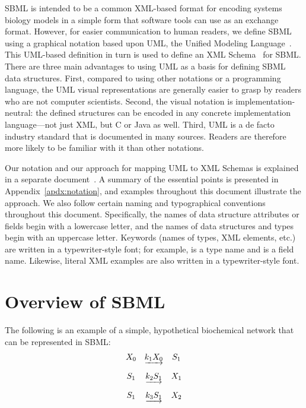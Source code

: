\documentclass[10pt]{cekarticle}
\begin{document}
SBML is intended to be a common XML-based format for encoding systems
biology models in a simple form that software tools can use as an exchange
format.  However, for easier communication to human readers, we define SBML
using a graphical notation based upon UML, the Unified Modeling
Language~\citep{eriksson:1998,oestereich:1999}.  This UML-based definition
in turn is used to define an XML
Schema~\citep{biron:2000,fallside:2000,thompson:2000} for SBML.  There are
three main advantages to using UML as a basis for defining SBML data
structures.  First, compared to using other notations or a programming
language, the UML visual representations are generally easier to grasp by
readers who are not computer scientists.  Second, the visual notation is
implementation-neutral: the defined structures can be encoded in any
concrete implementation language---not just XML, but C or Java as well.
Third, UML is a de facto industry standard that is documented in many
sources.  Readers are therefore more likely to be familiar with it than
other notations.

Our notation and our approach for mapping UML to XML Schemas is explained
in a separate document~\citep{hucka:2000b}.  A summary of the essential
points is presented in Appendix~\ref{apdx:notation}, and examples
throughout this document illustrate the approach.  We also follow certain
naming and typographical conventions throughout this document.
Specifically, the names of data structure attributes or fields begin with a
lowercase letter, and the names of data structures and types begin with an
uppercase letter.  Keywords (names of types, XML elements, etc.) are
written in a typewriter-style font; for example,  is a
type name and  is a field name.  Likewise, literal XML
examples are also written in a typewriter-style font.


\section{Overview of SBML}
\label{sec:overview}

The following is an example of a simple, hypothetical biochemical network that
can be represented in SBML:
\begin{equation*}
  \begin{array}{@{}ccc@{}}
    X_0 & \underrightarrow{k_1 X_0} & S_1 \\ \\[-4pt]
    S_1 & \underrightarrow{k_2 S_1} & X_1 \\ \\[-4pt]
    S_1 & \underrightarrow{k_3 S_1} & X_2
  \end{array}
\end{equation*}
\end{document}
